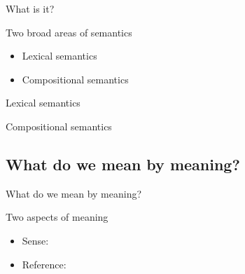 \documentclass{beamer}
\newcommand{\suboneone}{What is it?}
\newcommand{\subonetwo}{What do we mean by meaning?}
\begin{document}
      \begin{frame}{\suboneone}
        \begin{block}{Two broad areas of semantics}
          \begin{itemize}
            \item Lexical semantics
            \item Compositional semantics
          \end{itemize}
        \end{block}
        \begin{alertblock}{Lexical semantics}
          
        \end{alertblock}
        \begin{alertblock}{Compositional semantics}
          
        \end{alertblock}
      \end{frame}

    \subsection{\subonetwo}
      \begin{frame}[t]{\subonetwo}
        \begin{block}{Two aspects of meaning}
          \begin{itemize}
            \item \alert{Sense}: 
            \item \alert{Reference}: 
          \end{itemize}
        \end{block}
      \end{frame}
\end{document}

